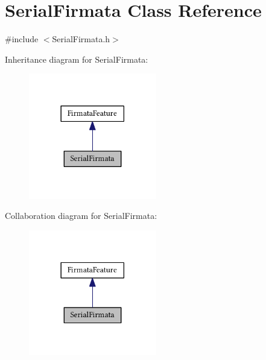 \hypertarget{class_serial_firmata}{}\section{Serial\+Firmata Class Reference}
\label{class_serial_firmata}


{\ttfamily \#include $<$Serial\+Firmata.\+h$>$}



Inheritance diagram for Serial\+Firmata\+:\nopagebreak
\begin{figure}[H]
\begin{center}
\leavevmode
\includegraphics[width=158pt]{class_serial_firmata__inherit__graph}
\end{center}
\end{figure}


Collaboration diagram for Serial\+Firmata\+:\nopagebreak
\begin{figure}[H]
\begin{center}
\leavevmode
\includegraphics[width=158pt]{class_serial_firmata__coll__graph}
\end{center}
\end{figure}
